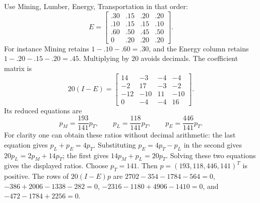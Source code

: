 Use Mining, Lumber, Energy, Transportation in that order:
\[E=\begin{bmatrix}
.30&.15&.20&.20\\.10&.15&.15&.10\\
.60&.50&.45&.50\\0&.20&.20&.20
\end{bmatrix}.\]
For instance Mining retains $1-.10-.60=.30$, and the Energy column
retains $1-.20-.15-.20=.45$.
Multiplying by $20$ avoids decimals. The coefficient matrix is
\[20(I-E)=\begin{bmatrix}14&-3&-4&-4\\-2&17&-3&-2\\
-12&-10&11&-10\\0&-4&-4&16\end{bmatrix}.\]
Its reduced equations are
\[p_M=\frac{193}{141}p_T,\qquad
p_L=\frac{118}{141}p_T,\qquad
p_E=\frac{446}{141}p_T.\]
For clarity one can obtain these ratios without decimal arithmetic:
the last equation gives $p_L+p_E=4p_T$. Substituting
$p_E=4p_T-p_L$ in the second gives $20p_L=2p_M+14p_T$;
the first gives $14p_M+p_L=20p_T$. Solving these two equations
gives the displayed ratios.
Choose $p_T=141$. Then $p=(193,118,446,141)^T$ is positive.
The rows of $20(I-E)p$ are
$2702-354-1784-564=0$,
$-386+2006-1338-282=0$,
$-2316-1180+4906-1410=0$, and $-472-1784+2256=0$.

